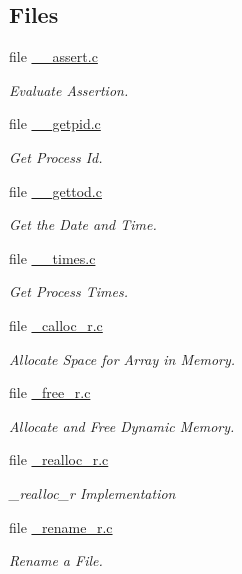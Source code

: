 \subsection*{Files}
\begin{DoxyCompactItemize}
\item 
file \mbox{\hyperlink{____assert_8c}{\+\_\+\+\_\+assert.\+c}}
\begin{DoxyCompactList}\small\item\em Evaluate Assertion. \end{DoxyCompactList}\item 
file \mbox{\hyperlink{____getpid_8c}{\+\_\+\+\_\+getpid.\+c}}
\begin{DoxyCompactList}\small\item\em Get Process Id. \end{DoxyCompactList}\item 
file \mbox{\hyperlink{____gettod_8c}{\+\_\+\+\_\+gettod.\+c}}
\begin{DoxyCompactList}\small\item\em Get the Date and Time. \end{DoxyCompactList}\item 
file \mbox{\hyperlink{____times_8c}{\+\_\+\+\_\+times.\+c}}
\begin{DoxyCompactList}\small\item\em Get Process Times. \end{DoxyCompactList}\item 
file \mbox{\hyperlink{__calloc__r_8c}{\+\_\+calloc\+\_\+r.\+c}}
\begin{DoxyCompactList}\small\item\em Allocate Space for Array in Memory. \end{DoxyCompactList}\item 
file \mbox{\hyperlink{__free__r_8c}{\+\_\+free\+\_\+r.\+c}}
\begin{DoxyCompactList}\small\item\em Allocate and Free Dynamic Memory. \end{DoxyCompactList}\item 
file \mbox{\hyperlink{__realloc__r_8c}{\+\_\+realloc\+\_\+r.\+c}}
\begin{DoxyCompactList}\small\item\em \+\_\+realloc\+\_\+r Implementation \end{DoxyCompactList}\item 
file \mbox{\hyperlink{__rename__r_8c}{\+\_\+rename\+\_\+r.\+c}}
\begin{DoxyCompactList}\small\item\em Rename a File. \end{DoxyCompactList}\item 

\end{DoxyCompactItemize}
